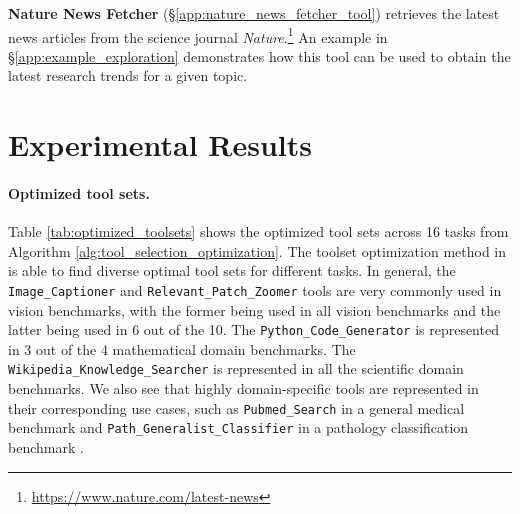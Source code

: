 \textbf{Nature News Fetcher} (\S\ref{app:nature_news_fetcher_tool}) retrieves the latest news articles from the science journal \textit{Nature}.\footnote{\url{https://www.nature.com/latest-news}} An example in \S\ref{app:example_exploration} demonstrates how this tool can be used to obtain the latest research trends for a given topic.


\section{Experimental Results}
\label{app:exp_results}

\paragraph{Optimized tool sets.}  Table \ref{tab:optimized_toolsets} shows the optimized tool sets across 16 tasks from Algorithm \ref{alg:tool_selection_optimization}. The toolset optimization method in \model is able to find diverse optimal tool sets for different tasks. In general, the \texttt{Image\_Captioner} and \texttt{Relevant\_Patch\_Zoomer} tools are very commonly used in vision benchmarks, with the former being used in all vision benchmarks and the latter being used in 6 out of the 10. The \texttt{Python\_Code\_Generator} is represented in 3 out of the 4 mathematical domain benchmarks. The \texttt{Wikipedia\_Knowledge\_Searcher} is represented in all the scientific domain benchmarks. We also see that highly domain-specific tools are represented in their corresponding use cases, such as \texttt{Pubmed\_Search} in a general medical benchmark \cite{jin2021disease} and \texttt{Path\_Generalist\_Classifier} in a pathology classification benchmark \cite{sun2025pathmmu}. 

